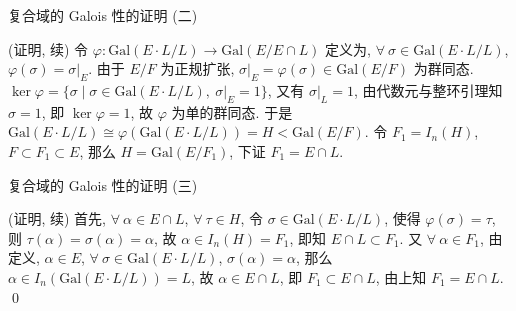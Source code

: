 \begin{frame}{复合域的 Galois 性的证明 (二)}

\startproof[bg=yellow, fg=red](证明, 续)
令 $\varphi: \mathrm{Gal}(E \cdot L/L) \longrightarrow \mathrm{Gal}(E/E \cap L)$
定义为, $\forall\ \sigma \in \mathrm{Gal}(E \cdot L/L)$, $\varphi(\sigma) = \sigma|_E$.
由于 $E/F$ 为正规扩张, $\sigma|_E = \varphi(\sigma) \in \mathrm{Gal}(E/F)$
为群同态.
$\ker \varphi = \{ \sigma \mid \sigma \in \mathrm{Gal}(E \cdot L/L),\
\sigma|_E = 1 \}$, 又有 $\sigma|_L = 1$,
由代数元与整环引理知 $\sigma = 1$, 即 $\ker \varphi = 1$, 故 $\varphi$
为单的群同态.
于是 $\mathrm{Gal}(E \cdot L/L) \cong \varphi(\mathrm{Gal}(E \cdot L/L))
= H < \mathrm{Gal}(E/F)$.
令 $F_1 = I_n(H)$, $F \subset F_1 \subset E$, 那么 $H = \mathrm{Gal}(E/F_1)$,
下证 $F_1 = E \cap L$.

\end{frame}


\begin{frame}{复合域的 Galois 性的证明 (三)}

\startproof[bg=yellow, fg=red](证明, 续)
首先, $\forall\ \alpha \in E \cap L$, $\forall\ \tau \in H$,
令 $\sigma \in \mathrm{Gal}(E \cdot L/L)$, 使得 $\varphi(\sigma) = \tau$,
则 $\tau(\alpha) = \sigma(\alpha) = \alpha$, 故 $\alpha \in I_n(H) = F_1$,
即知 $E \cap L \subset F_1$.
又 $\forall\ \alpha \in F_1$, 由定义, $\alpha \in E$,
$\forall\ \sigma \in \mathrm{Gal}(E \cdot L/L)$, $\sigma(\alpha) = \alpha$,
那么 $\alpha \in I_n(\mathrm{Gal}(E \cdot L/L)) = L$, 故 $\alpha \in E \cap L$,
即 $F_1 \subset E \cap L$,
由上知 $F_1 = E \cap L$.
\qed

\end{frame}



